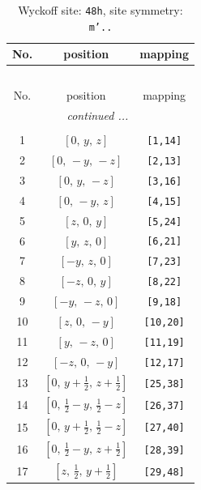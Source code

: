 \documentclass[fleqn,8pt]{jsarticle}
\begin{document}
\begin{longtable}{ccc}
\caption{Wyckoff site: {\tt 48h}, site symmetry: {\tt m'..}}
 \\
 \hline \hline
No. & position & mapping \\ \hline \endfirsthead

\multicolumn{2}{l}{\tablename\ \thetable{}} \\
 \hline \hline
No. & position & mapping \\ \hline \endhead

 \hline \hline
\multicolumn{2}{r}{\footnotesize\it continued ...} \\ \endfoot

 \hline \hline
\multicolumn{2}{r}{} \\ \endlastfoot

1 & $\left[ 0,\, y,\, z \right]$ & {\tt [1,14]} \\ \hline
2 & $\left[ 0,\, - y,\, - z \right]$ & {\tt [2,13]} \\ \hline
3 & $\left[ 0,\, y,\, - z \right]$ & {\tt [3,16]} \\ \hline
4 & $\left[ 0,\, - y,\, z \right]$ & {\tt [4,15]} \\ \hline
5 & $\left[ z,\, 0,\, y \right]$ & {\tt [5,24]} \\ \hline
6 & $\left[ y,\, z,\, 0 \right]$ & {\tt [6,21]} \\ \hline
7 & $\left[ - y,\, z,\, 0 \right]$ & {\tt [7,23]} \\ \hline
8 & $\left[ - z,\, 0,\, y \right]$ & {\tt [8,22]} \\ \hline
9 & $\left[ - y,\, - z,\, 0 \right]$ & {\tt [9,18]} \\ \hline
10 & $\left[ z,\, 0,\, - y \right]$ & {\tt [10,20]} \\ \hline
11 & $\left[ y,\, - z,\, 0 \right]$ & {\tt [11,19]} \\ \hline
12 & $\left[ - z,\, 0,\, - y \right]$ & {\tt [12,17]} \\ \hline
13 & $\left[ 0,\, y + \frac{1}{2},\, z + \frac{1}{2} \right]$ & {\tt [25,38]} \\ \hline
14 & $\left[ 0,\, \frac{1}{2} - y,\, \frac{1}{2} - z \right]$ & {\tt [26,37]} \\ \hline
15 & $\left[ 0,\, y + \frac{1}{2},\, \frac{1}{2} - z \right]$ & {\tt [27,40]} \\ \hline
16 & $\left[ 0,\, \frac{1}{2} - y,\, z + \frac{1}{2} \right]$ & {\tt [28,39]} \\ \hline
17 & $\left[ z,\, \frac{1}{2},\, y + \frac{1}{2} \right]$ & {\tt [29,48]} \\ \hline

\end{longtable}
\end{document}
